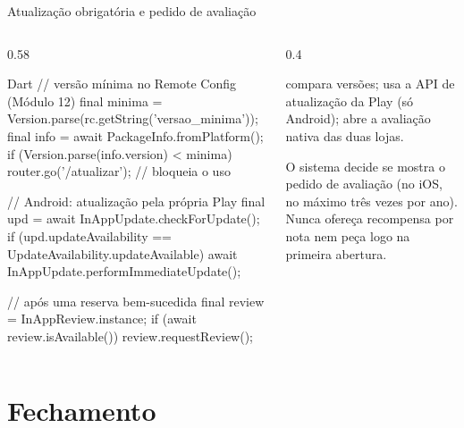 \documentclass[aspectratio=169,10pt]{beamer}
\begin{document}
\begin{frame}[fragile]{Atualização obrigatória e pedido de avaliação}
  \begin{columns}[T]
    \begin{column}{0.58\textwidth}
\begin{codigo}[title=Na abertura do app]{Dart}
// versão mínima no Remote Config (Módulo 12)
final minima = Version.parse(rc.getString('versao_minima'));
final info = await PackageInfo.fromPlatform();
if (Version.parse(info.version) < minima) {
  router.go('/atualizar');          // bloqueia o uso
}

// Android: atualização pela própria Play
final upd = await InAppUpdate.checkForUpdate();
if (upd.updateAvailability ==
    UpdateAvailability.updateAvailable) {
  await InAppUpdate.performImmediateUpdate();
}

// após uma reserva bem-sucedida
final review = InAppReview.instance;
if (await review.isAvailable()) review.requestReview();
\end{codigo}
    \end{column}
    \begin{column}{0.4\textwidth}
      \begin{conceito}[Pacotes]
         compara versões;  usa a API de atualização da Play (só Android);  abre a avaliação nativa das duas lojas.
      \end{conceito}
      \begin{atencao}
        O sistema decide se mostra o pedido de avaliação (no iOS, no máximo três vezes por ano). Nunca ofereça recompensa por nota nem peça logo na primeira abertura.
      \end{atencao}
    \end{column}
  \end{columns}
\end{frame}

\section{Fechamento}
\end{document}

